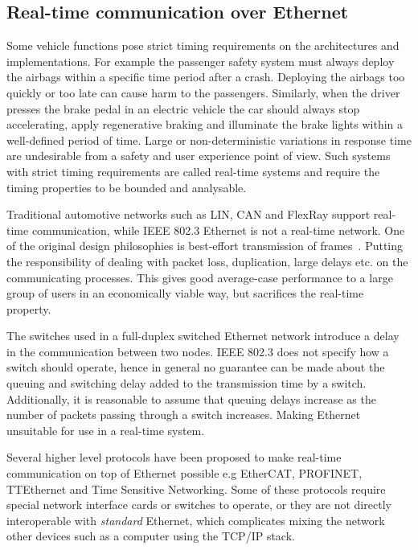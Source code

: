 \subsection{Real-time communication over Ethernet}
\label{sec:real-time-comm}
Some vehicle functions pose strict timing requirements on the architectures and implementations. For example the passenger safety system must always deploy the airbags within a specific time period after a crash. Deploying the airbags too quickly or too late can cause harm to the passengers. Similarly, when the driver presses the brake pedal in an electric vehicle the car should always stop accelerating, apply regenerative braking and illuminate the brake lights within a well-defined period of time. Large or non-deterministic variations in response time are undesirable from a safety and user experience point of view. Such systems with strict timing requirements are called real-time systems and require the timing properties to be bounded and analysable. 

Traditional automotive networks such as LIN, CAN and FlexRay support real-time communication, while IEEE 802.3 Ethernet is not a real-time network. One of the original design philosophies is best-effort transmission of frames~\cite{metcalfe1976ethernet}. Putting the responsibility of dealing with packet loss, duplication, large delays etc. on the communicating processes. This gives good average-case performance to a large group of users in an economically viable way, but sacrifices the real-time property.

The switches used in a full-duplex switched Ethernet network introduce a delay in the communication between two nodes. IEEE 802.3 does not specify how a switch should operate, hence in general no guarantee can be made about the queuing and switching delay added to the transmission time by a switch. Additionally, it is reasonable to assume that queuing delays increase as the number of packets passing through a switch increases. Making Ethernet unsuitable for use in a real-time system. 

Several higher level protocols have been proposed to make real-time communication on top of Ethernet possible e.g EtherCAT, PROFINET, TTEthernet and Time Sensitive Networking. Some of these protocols require special network interface cards or switches to operate, or they are not directly interoperable with \textit{standard} Ethernet, which complicates mixing the network other devices such as a computer using the TCP/IP stack.

